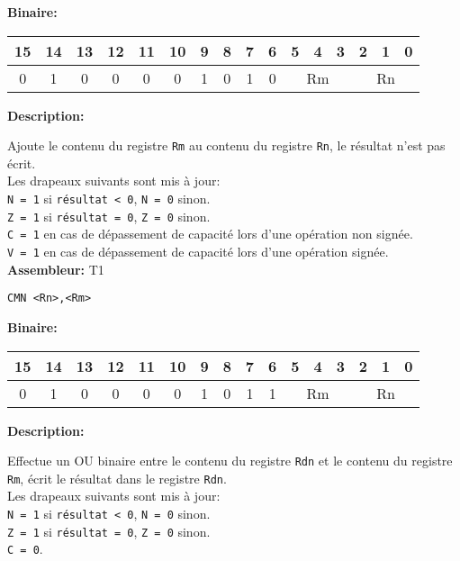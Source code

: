 \textbf{Binaire:}\\

\begin{tabular}{| c c c c c c c c c c c c c c c c |}
\hline
15 & 14 & 13 & 12 & 11 & 10 & \multicolumn{1}{|c}{9} & 8 & 7 & 6 & \multicolumn{1}{|c}{5} & 4 & 3 & \multicolumn{1}{|c}{2} & 1 & 0 \\
\hline
0 & 1 & 0 & 0 & 0 & 0 & \multicolumn{1}{|c}{1} & 0 & 1 & 0 & \multicolumn{3}{|c}{Rm} & \multicolumn{3}{|c|}{Rn} \\
\hline
\end{tabular}



\textbf{Description: }

Ajoute le contenu du registre \texttt{Rm} au contenu du registre \texttt{Rn}, le résultat n'est pas écrit.\\
Les drapeaux suivants sont mis à jour:\\
\texttt{N = 1} si \texttt{résultat < 0}, \texttt{N = 0} sinon.\\
\texttt{Z = 1} si \texttt{résultat = 0}, \texttt{Z = 0} sinon.\\
\texttt{C = 1} en cas de dépassement de capacité lors d'une opération non signée.\\
\texttt{V = 1} en cas de dépassement de capacité lors d'une opération signée.\\

\textbf{Assembleur:} T1

\begin{lstlisting}
CMN <Rn>,<Rm>
\end{lstlisting}

\textbf{Binaire:}\\

\begin{tabular}{| c c c c c c c c c c c c c c c c |}
\hline
15 & 14 & 13 & 12 & 11 & 10 & \multicolumn{1}{|c}{9} & 8 & 7 & 6 & \multicolumn{1}{|c}{5} & 4 & 3 & \multicolumn{1}{|c}{2} & 1 & 0 \\
\hline
0 & 1 & 0 & 0 & 0 & 0 & \multicolumn{1}{|c}{1} & 0 & 1 & 1 & \multicolumn{3}{|c}{Rm} & \multicolumn{3}{|c|}{Rn} \\
\hline
\end{tabular}



\textbf{Description: }

Effectue un OU binaire entre le contenu du registre \texttt{Rdn} et le contenu du registre \texttt{Rm}, écrit le résultat dans le registre \texttt{Rdn}.\\
Les drapeaux suivants sont mis à jour:\\
\texttt{N = 1} si \texttt{résultat < 0}, \texttt{N = 0} sinon.\\
\texttt{Z = 1} si \texttt{résultat = 0}, \texttt{Z = 0} sinon.\\
\texttt{C = 0}.\\

